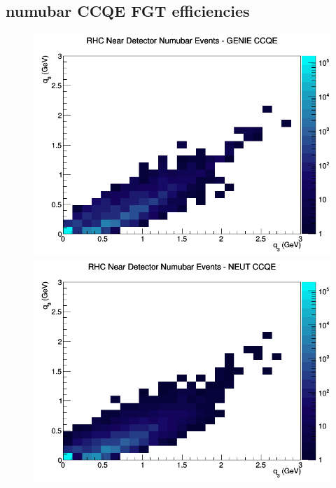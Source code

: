 \subsection{numubar CCQE FGT efficiencies}
\begin{figure}[h]
\includegraphics[width=\linewidth]{eff_q0_q3/FGT/CCQE_RHC_ND_numubar_q3_q0_GENIE.png}
\endminipage
{}
\includegraphics[width=\linewidth]{eff_q0_q3/FGT/CCQE_RHC_ND_numubar_q3_q0_NEUT.png}
\endminipage
{}

\end{figure}
